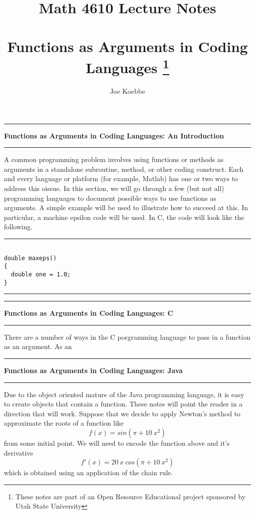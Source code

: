 \documentclass[10pt,fleqn]{article}
\title{Math 4610 Lecture Notes \\
            \ \\
       Functions as Arguments in Coding Languages
  \footnote{These notes are part of an Open Resource Educational project
            sponsored by Utah State University}}
\author{Joe Koebbe}
\begin{document}
\maketitle
\newpage

\vskip0.1in\hrule\vskip0.1in
\noindent
{\bf Functions as Arguments in Coding Languages: An Introduction}
\vskip0.1in\hrule\vskip0.1in
\noindent
A common programming problem involves using functions or methods as arguments
in a standalone subroutine, method, or other coding construct. Each and every
language or platform (for example, Matlab) has one or two ways to address this
oissue. In this section, we will go through a few (but not all) programming
languages to document possible ways to use functions as arguments. A simple
example will be used to illustrate how to succeed at this. In particular, a
machine epsilon code will be used. In C, the code will look like the following.
\vskip0.1in\hrule\vskip0.1in
\begin{verbatim}

double maxeps()
{
  double one = 1.0;
}

\end{verbatim}
\vskip0.1in\hrule\vskip0.1in
\newpage
\vskip0.1in\hrule\vskip0.1in
\noindent
{\bf Functions as Arguments in Coding Languages: C}
\vskip0.1in\hrule\vskip0.1in
\noindent
There are a number of ways in the C porgramming language to pass in a function
as an argument. As an 
\newpage
\vskip0.1in\hrule\vskip0.1in
\noindent
{\bf Functions as Arguments in Coding Languages: Java}
\vskip0.1in\hrule\vskip0.1in
\noindent
Due to the object oriented mature of the Java programming language, it is easy
to create objects that contain a function. These notes will point the reader in
a direction that will work. Suppose that we decide to apply Newton's method to
approximate the roots of a function like
\[
  f(x) = sin(\pi + 10\ x^2)
\]
from some initial point. We will need to encode the function above and it's
derivative
\[
  f'(x) = 20\ x\ cos(\pi + 10\ x^2)
\]
which is obtained using an application of the chain rule.
\end{document}
